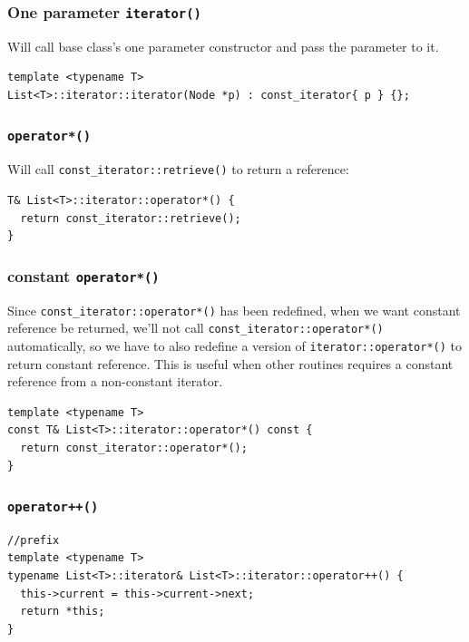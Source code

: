 \documentclass[11pt]{book}
\begin{document}
\subsubsection{One parameter \texttt{iterator()}}
\label{sec:org8ea0b20}
Will call base class's one parameter constructor and pass the parameter to it.
\begin{verbatim}
template <typename T>
List<T>::iterator::iterator(Node *p) : const_iterator{ p } {};
\end{verbatim}
\subsubsection{\texttt{operator*()}}
\label{sec:org9154e98}
Will call \texttt{const\_iterator::retrieve()} to return a reference:
\begin{verbatim}
T& List<T>::iterator::operator*() {
  return const_iterator::retrieve();
}
\end{verbatim}
\subsubsection{constant \texttt{operator*()}}
\label{sec:org3e07dde}
Since \texttt{const\_iterator::operator*()} has been redefined, when we want constant reference be returned, we'll not call \texttt{const\_iterator::operator*()} automatically, so we have to also redefine a version of \texttt{iterator::operator*()} to return constant reference. This is useful when other routines requires a constant reference from a non-constant iterator.
\begin{verbatim}
template <typename T>
const T& List<T>::iterator::operator*() const {
  return const_iterator::operator*();
}
\end{verbatim}
\subsubsection{\texttt{operator++()}}
\label{sec:org2f474eb}
\begin{verbatim}
//prefix
template <typename T>
typename List<T>::iterator& List<T>::iterator::operator++() {
  this->current = this->current->next;
  return *this;
}
\end{verbatim}
\end{document}
